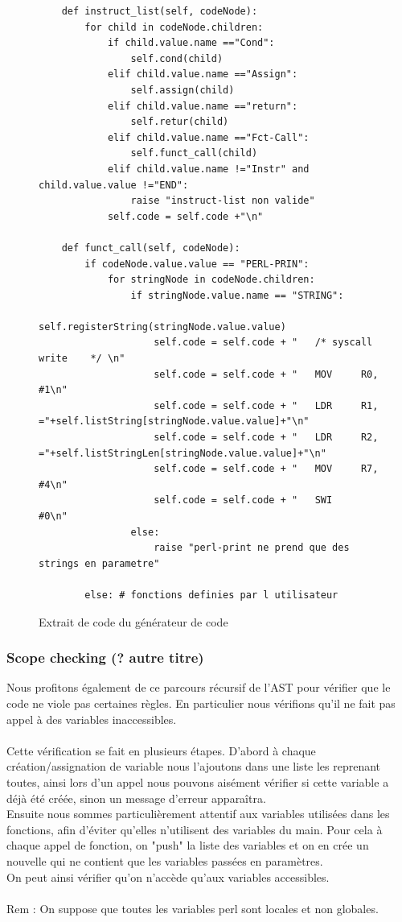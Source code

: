 \documentclass[a4paper,10pt]{article}
\begin{document}
	\begin{figure}[H]
\begin{lstlisting}
	def instruct_list(self, codeNode):
		for child in codeNode.children:
			if child.value.name =="Cond":
				self.cond(child)
			elif child.value.name =="Assign":
				self.assign(child)
			elif child.value.name =="return":
				self.retur(child)
			elif child.value.name =="Fct-Call":
				self.funct_call(child)
			elif child.value.name !="Instr" and child.value.value !="END":
				raise "instruct-list non valide"
			self.code = self.code +"\n"
				
	def funct_call(self, codeNode):
		if codeNode.value.value == "PERL-PRIN":
			for stringNode in codeNode.children:
				if stringNode.value.name == "STRING":
					self.registerString(stringNode.value.value)
					self.code = self.code + "	/* syscall write	*/ \n"
					self.code = self.code + "	MOV 	R0, #1\n"
					self.code = self.code + "	LDR 	R1, ="+self.listString[stringNode.value.value]+"\n"
					self.code = self.code + "	LDR 	R2, ="+self.listStringLen[stringNode.value.value]+"\n"
					self.code = self.code + "	MOV 	R7, #4\n"
					self.code = self.code + "	SWI 	#0\n"
				else:
					raise "perl-print ne prend que des strings en parametre"
			
		else: # fonctions definies par l utilisateur
\end{lstlisting}
\fontfamily{}
\caption{Extrait de code du générateur de code}
\label{lst:codeGeneration}
\end{figure}
	
	\subsubsection{Scope checking (? autre titre)}
		Nous profitons également de ce parcours récursif de l'AST pour vérifier que le code ne viole pas certaines règles. En particulier nous vérifions qu'il ne fait pas appel à des variables inaccessibles.\\
		~\\
		Cette vérification se fait en plusieurs étapes. D'abord à chaque création/assignation de variable nous l'ajoutons dans une liste les reprenant toutes, ainsi lors d'un appel nous pouvons aisément vérifier si cette variable a déjà été créée, sinon un message d'erreur apparaîtra.\\
		Ensuite nous sommes particulièrement attentif aux variables utilisées dans les fonctions, afin d'éviter qu'elles n'utilisent des variables du main. Pour cela à chaque appel de fonction, on "push" la liste des variables et on en crée un nouvelle qui ne contient que les variables passées en paramètres.\\
		On peut ainsi vérifier qu'on n'accède qu'aux variables accessibles.\\
		~\\
		Rem : On suppose que toutes les variables perl sont locales et non globales.
	
\end{document}
